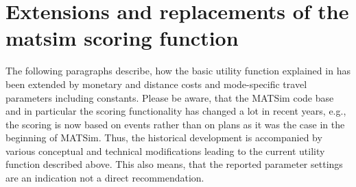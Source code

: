 
%

\section{Extensions and replacements of the \acrshort{matsim} scoring function}
\label{sec:utfextensions}
The following paragraphs describe, how the basic utility function explained in \citet[][]{CharyparNagel_Transportation_2005} has been extended by monetary and distance costs and mode-specific travel parameters including constants. Please be aware, that the MATSim code base and in particular the scoring functionality has changed a lot in recent years, e.g.,\,the scoring is now based on events rather than on plans as it was the case in the beginning of MATSim. Thus, the historical development is accompanied by various conceptual and technical modifications leading to the current utility function described above. This also means, that the reported parameter settings are an indication not a direct recommendation.


